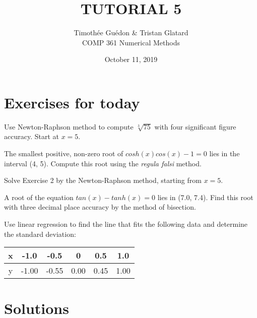 \documentclass[12pt]{article}
\newenvironment{exercise}[2][Exercise]{\begin{trivlist}
\item[\hskip \labelsep {\bfseries #1}\hskip \labelsep {\bfseries #2.}]}{\end{trivlist}}
\begin{document}
\title{TUTORIAL 5}
\author{Timothée Guédon \& Tristan Glatard\\
COMP 361 Numerical Methods}
\date{October 11, 2019}
\maketitle

\section{Exercises for today}

\begin{exercise}{1}
Use Newton-Raphson method to compute $\sqrt[3]{75}$ with four significant figure accuracy. Start at $x = 5$.
\end{exercise}

\begin{exercise}{2}
The smallest positive, non-zero root of $cosh(x)cos(x)-1=0$ lies in the interval
(4, 5). Compute this root using the \textit{regula falsi} method.
\end{exercise}

\begin{exercise}{3}
Solve Exercise 2 by the Newton-Raphson method, starting from $x=5$.
\end{exercise}

\begin{exercise}{4}
A root of the equation $tan(x)-tanh(x)=0$ lies in (7.0, 7.4). Find this root with three
decimal place accuracy by the method of bisection.
\end{exercise}

\begin{exercise}{5}
Use linear regression to find the line that fits the following data and determine the standard deviation:\\
\begin{table}[h]
  \centering
  \begin{tabular}{|c|c|c|c|c|c|}
    \hline
    x & -1.0 & -0.5 & 0 & 0.5 & 1.0 \\ \hline
    y & -1.00 & -0.55 & 0.00 & 0.45 & 1.00 \\ \hline
  \end{tabular}
\end{table}

\end{exercise}

\break

\section{Solutions}
\end{document}
